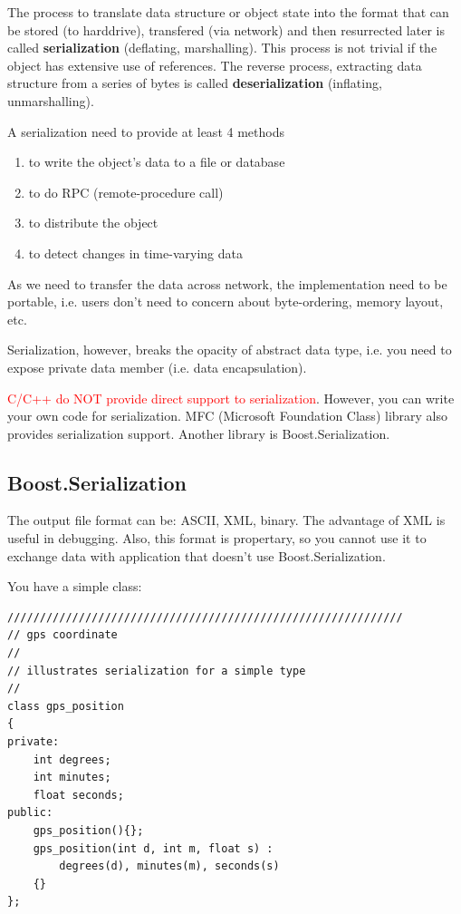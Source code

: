 The process to translate data structure or object state into the format that can
be stored (to harddrive), transfered (via network) and then resurrected later is
called {\bf serialization} (deflating, marshalling). This process is not trivial
if the object has extensive use of references. The reverse process, extracting
data structure from a series of bytes is called {\bf deserialization}
(inflating, unmarshalling).

A serialization need to provide at least 4 methods
\begin{enumerate}
  \item to write the object's data to a file or database
  \item to do RPC (remote-procedure call)
  \item to distribute the object
  \item to detect changes in time-varying data
\end{enumerate}
As we need to transfer the data across network, the implementation need to be
portable, i.e. users don't need to concern about byte-ordering, memory layout,
etc.

Serialization, however, breaks the opacity of abstract data type, i.e. you need
to expose private data member (i.e. data encapsulation).

\textcolor{red}{C/C++ do NOT provide direct support to serialization}. However, you can write
your own code for serialization. MFC (Microsoft Foundation Class) library also
provides serialization support. Another library is Boost.Serialization.

\subsection{Boost.Serialization}

The output file format can be: ASCII, XML, binary. The advantage of XML is
useful in debugging. Also, this format is propertary, so you cannot use it to
exchange data with application that doesn't use Boost.Serialization.

You have a simple class:
\begin{verbatim}
/////////////////////////////////////////////////////////////
// gps coordinate
//
// illustrates serialization for a simple type
//
class gps_position
{
private:
    int degrees;
    int minutes;
    float seconds;
public:
    gps_position(){};
    gps_position(int d, int m, float s) :
        degrees(d), minutes(m), seconds(s)
    {}
};
\end{verbatim}

